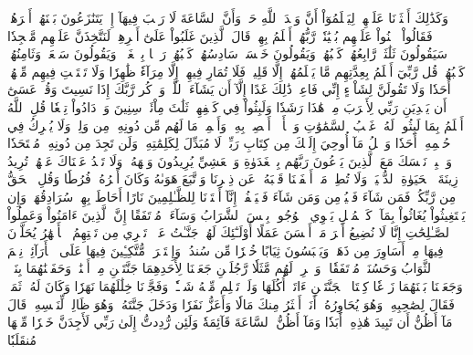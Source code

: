 وَكَذَٰلِكَ أَعۡثَرۡنَا عَلَيۡهِمۡ لِيَعۡلَمُوٓاْ أَنَّ وَعۡدَ ٱللَّهِ حَقّٞ وَأَنَّ ٱلسَّاعَةَ لَا رَيۡبَ فِيهَآ إِذۡ يَتَنَٰزَعُونَ بَيۡنَهُمۡ أَمۡرَهُمۡۖ فَقَالُواْ ٱبۡنُواْ عَلَيۡهِم بُنۡيَٰنٗاۖ رَّبُّهُمۡ أَعۡلَمُ بِهِمۡۚ قَالَ ٱلَّذِينَ غَلَبُواْ عَلَىٰٓ أَمۡرِهِمۡ لَنَتَّخِذَنَّ عَلَيۡهِم مَّسۡجِدٗا
سَيَقُولُونَ ثَلَٰثَةٞ رَّابِعُهُمۡ كَلۡبُهُمۡ وَيَقُولُونَ خَمۡسَةٞ سَادِسُهُمۡ كَلۡبُهُمۡ رَجۡمَۢا بِٱلۡغَيۡبِۖ وَيَقُولُونَ سَبۡعَةٞ وَثَامِنُهُمۡ كَلۡبُهُمۡۚ قُل رَّبِّيٓ أَعۡلَمُ بِعِدَّتِهِم مَّا يَعۡلَمُهُمۡ إِلَّا قَلِيلٞۗ فَلَا تُمَارِ فِيهِمۡ إِلَّا مِرَآءٗ ظَٰهِرٗا وَلَا تَسۡتَفۡتِ فِيهِم مِّنۡهُمۡ أَحَدٗا
وَلَا تَقُولَنَّ لِشَاْيۡءٍ إِنِّي فَاعِلٞ ذَٰلِكَ غَدًا
إِلَّآ أَن يَشَآءَ ٱللَّهُۚ وَٱذۡكُر رَّبَّكَ إِذَا نَسِيتَ وَقُلۡ عَسَىٰٓ أَن يَهۡدِيَنِ رَبِّي لِأَقۡرَبَ مِنۡ هَٰذَا رَشَدٗا
وَلَبِثُواْ فِي كَهۡفِهِمۡ ثَلَٰثَ مِاْئَةٖ سِنِينَ وَٱزۡدَادُواْ تِسۡعٗا
قُلِ ٱللَّهُ أَعۡلَمُ بِمَا لَبِثُواْۖ لَهُۥ غَيۡبُ ٱلسَّمَٰوَٰتِ وَٱلۡأَرۡضِۖ أَبۡصِرۡ بِهِۦ وَأَسۡمِعۡۚ مَا لَهُم مِّن دُونِهِۦ مِن وَلِيّٖ وَلَا يُشۡرِكُ فِي حُكۡمِهِۦٓ أَحَدٗا
وَٱتۡلُ مَآ أُوحِيَ إِلَيۡكَ مِن كِتَابِ رَبِّكَۖ لَا مُبَدِّلَ لِكَلِمَٰتِهِۦ وَلَن تَجِدَ مِن دُونِهِۦ مُلۡتَحَدٗا
وَٱصۡبِرۡ نَفۡسَكَ مَعَ ٱلَّذِينَ يَدۡعُونَ رَبَّهُم بِٱلۡغَدَوٰةِ وَٱلۡعَشِيِّ يُرِيدُونَ وَجۡهَهُۥۖ وَلَا تَعۡدُ عَيۡنَاكَ عَنۡهُمۡ تُرِيدُ زِينَةَ ٱلۡحَيَوٰةِ ٱلدُّنۡيَاۖ وَلَا تُطِعۡ مَنۡ أَغۡفَلۡنَا قَلۡبَهُۥ عَن ذِكۡرِنَا وَٱتَّبَعَ هَوَىٰهُ وَكَانَ أَمۡرُهُۥ فُرُطٗا
وَقُلِ ٱلۡحَقُّ مِن رَّبِّكُمۡۖ فَمَن شَآءَ فَلۡيُؤۡمِن وَمَن شَآءَ فَلۡيَكۡفُرۡۚ إِنَّآ أَعۡتَدۡنَا لِلظَّـٰلِمِينَ نَارًا أَحَاطَ بِهِمۡ سُرَادِقُهَاۚ وَإِن يَسۡتَغِيثُواْ يُغَاثُواْ بِمَآءٖ كَٱلۡمُهۡلِ يَشۡوِي ٱلۡوُجُوهَۚ بِئۡسَ ٱلشَّرَابُ وَسَآءَتۡ مُرۡتَفَقًا
إِنَّ ٱلَّذِينَ ءَامَنُواْ وَعَمِلُواْ ٱلصَّـٰلِحَٰتِ إِنَّا لَا نُضِيعُ أَجۡرَ مَنۡ أَحۡسَنَ عَمَلًا
أُوْلَـٰٓئِكَ لَهُمۡ جَنَّـٰتُ عَدۡنٖ تَجۡرِي مِن تَحۡتِهِمُ ٱلۡأَنۡهَٰرُ يُحَلَّوۡنَ فِيهَا مِنۡ أَسَاوِرَ مِن ذَهَبٖ وَيَلۡبَسُونَ ثِيَابًا خُضۡرٗا مِّن سُندُسٖ وَإِسۡتَبۡرَقٖ مُّتَّكِـِٔينَ فِيهَا عَلَى ٱلۡأَرَآئِكِۚ نِعۡمَ ٱلثَّوَابُ وَحَسُنَتۡ مُرۡتَفَقٗا
۞وَٱضۡرِبۡ لَهُم مَّثَلٗا رَّجُلَيۡنِ جَعَلۡنَا لِأَحَدِهِمَا جَنَّتَيۡنِ مِنۡ أَعۡنَٰبٖ وَحَفَفۡنَٰهُمَا بِنَخۡلٖ وَجَعَلۡنَا بَيۡنَهُمَا زَرۡعٗا
كِلۡتَا ٱلۡجَنَّتَيۡنِ ءَاتَتۡ أُكُلَهَا وَلَمۡ تَظۡلِم مِّنۡهُ شَيۡـٔٗاۚ وَفَجَّرۡنَا خِلَٰلَهُمَا نَهَرٗا
وَكَانَ لَهُۥ ثَمَرٞ فَقَالَ لِصَٰحِبِهِۦ وَهُوَ يُحَاوِرُهُۥٓ أَنَا۠ أَكۡثَرُ مِنكَ مَالٗا وَأَعَزُّ نَفَرٗا
وَدَخَلَ جَنَّتَهُۥ وَهُوَ ظَالِمٞ لِّنَفۡسِهِۦ قَالَ مَآ أَظُنُّ أَن تَبِيدَ هَٰذِهِۦٓ أَبَدٗا
وَمَآ أَظُنُّ ٱلسَّاعَةَ قَآئِمَةٗ وَلَئِن رُّدِدتُّ إِلَىٰ رَبِّي لَأَجِدَنَّ خَيۡرٗا مِّنۡهَا مُنقَلَبٗا
